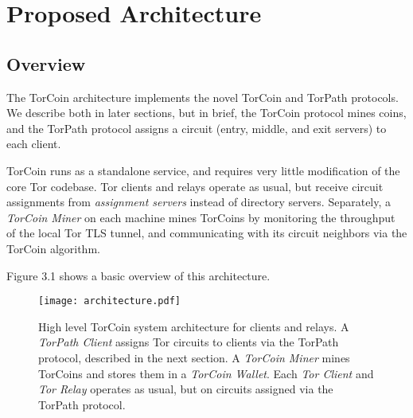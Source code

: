 \section{Proposed Architecture} \label{arch}

\subsection{Overview}

The TorCoin architecture implements the novel TorCoin and TorPath protocols. We
describe both in later sections, but in brief, the TorCoin protocol mines
coins, and the TorPath protocol assigns a circuit (entry, middle, and exit
servers) to each client.

TorCoin runs as a standalone service, and requires very little modification of
the core Tor codebase. Tor clients and relays operate as usual, but receive
circuit assignments from \textit{assignment servers} instead of directory 
servers. Separately, a \textit{TorCoin Miner} on each machine mines TorCoins
by monitoring the throughput of the local Tor TLS tunnel, and communicating with its circuit neighbors via the TorCoin algorithm.

Figure 3.1 shows a basic overview of this architecture.

\begin{figure}
  \centering
    \texttt{[image: architecture.pdf]}
  \caption{High level TorCoin system architecture for clients and relays. A \textit{TorPath Client} assigns Tor circuits to clients via the TorPath protocol, described in the next section. A \textit{TorCoin Miner} mines TorCoins and stores them in a \textit{TorCoin Wallet}. Each \textit{Tor Client} and \textit{Tor Relay} operates as usual, but on circuits assigned via the TorPath protocol.}
\end{figure}






